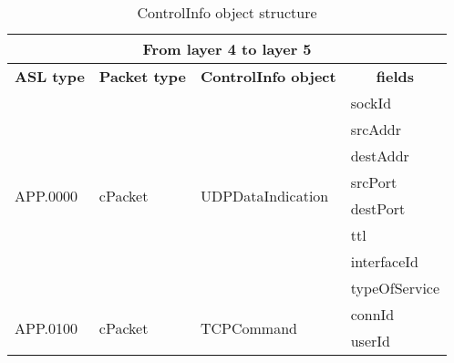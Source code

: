 \begin{table}
\centering
\ttfamily
\footnotesize
\caption{ControlInfo object structure}
\label{tab:from4-to5}
\begin{tabular}{|l|l|l|l|}
\hline
\multicolumn{4}{|c|}{\normalfont\textbf{From layer 4 to layer 5}}	\\
\hline
\multicolumn{1}{|c|}{\normalfont\textbf{ASL type}}	&\multicolumn{1}{c|}{\normalfont\textbf{Packet type}}	&\multicolumn{1}{c|}{\normalfont\textbf{ControlInfo object}}		&\multicolumn{1}{c|}{\normalfont\textbf{fields}}\\
\hline
\multirow{8}{*}{APP.0000}	&\multirow{8}{*}{cPacket}		&\multirow{8}{*}{UDPDataIndication}		&sockId			\\
					&						&								&srcAddr	\\
					&						&								&destAddr	\\
					&						&								&srcPort	\\
					&						&								&destPort	\\
					&						&								&ttl	\\
					&						&								&interfaceId	\\
					&						&								&typeOfService	\\					
\hline
\multirow{2}{*}{APP.0100}	&\multirow{2}{*}{cPacket}		&\multirow{2}{*}{TCPCommand}	&connId			\\
					&						&								&userId	\\
\hline
\end{tabular}
\end{table}




